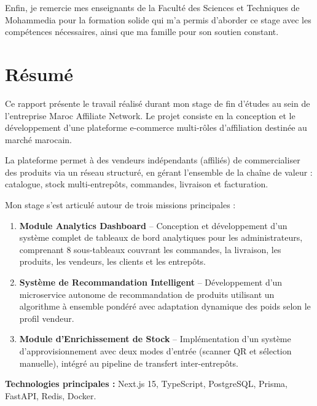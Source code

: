 \documentclass[12pt,a4paper,openany]{report}
\begin{document}
Enfin, je remercie mes enseignants de la Faculté des Sciences et Techniques de Mohammedia pour la formation solide qui m'a permis d'aborder ce stage avec les compétences nécessaires, ainsi que ma famille pour son soutien constant.

\newpage

\chapter*{Résumé}

Ce rapport présente le travail réalisé durant mon stage de fin d'études au sein de l'entreprise Maroc Affiliate Network. Le projet consiste en la conception et le développement d'une plateforme e-commerce multi-rôles d'affiliation destinée au marché marocain.

La plateforme permet à des vendeurs indépendants (affiliés) de commercialiser des produits via un réseau structuré, en gérant l'ensemble de la chaîne de valeur : catalogue, stock multi-entrepôts, commandes, livraison et facturation.

Mon stage s'est articulé autour de trois missions principales :

\begin{enumerate}
  \item \textbf{Module Analytics Dashboard} -- Conception et développement d'un système complet de tableaux de bord analytiques pour les administrateurs, comprenant 8 sous-tableaux couvrant les commandes, la livraison, les produits, les vendeurs, les clients et les entrepôts.

  \item \textbf{Système de Recommandation Intelligent} -- Développement d'un microservice autonome de recommandation de produits utilisant un algorithme à ensemble pondéré avec adaptation dynamique des poids selon le profil vendeur.

  \item \textbf{Module d'Enrichissement de Stock} -- Implémentation d'un système d'approvisionnement avec deux modes d'entrée (scanner QR et sélection manuelle), intégré au pipeline de transfert inter-entrepôts.
\end{enumerate}

\textbf{Technologies principales :} Next.js 15, TypeScript, PostgreSQL, Prisma, FastAPI, Redis, Docker.
\end{document}
